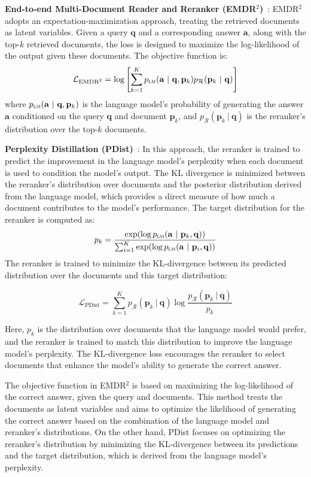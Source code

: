\textbf{End-to-end Multi-Document Reader and Reranker (EMDR$^2$)}~\cite{DBLP:conf/nips/SachanRHDY21, DBLP:conf/naacl/ShiMYS0LZY24, DBLP:conf/iclr/Lin0CSL00KSLZY24}: EMDR$^2$ adopts an expectation-maximization approach, treating the retrieved documents as latent variables. Given a query $\mathbf{q}$ and a corresponding answer $\mathbf{a}$, along with the top-$k$ retrieved documents, the loss is designed to maximize the log-likelihood of the output given these documents. The objective function is:
\[
\mathcal{L}_{\text{EMDR}^2} = \log \left[ \sum_{k=1}^K p_{\textsc{lm}}(\mathbf{a} \ | \ \mathbf{q}, \mathbf{p}_k) p_{\mathcal{R}}(\mathbf{p}_k \ | \ \mathbf{q}) \right]
\]
where $p_{\textsc{lm}}(\mathbf{a} \ | \ \mathbf{q}, \mathbf{p}_k)$ is the language model’s probability of generating the answer $\mathbf{a}$ conditioned on the query $\mathbf{q}$ and document $\mathbf{p}_k$, and $p_{\mathcal{R}}(\mathbf{p}_k \ | \ \mathbf{q})$ is the reranker’s distribution over the top-$k$ documents.

\textbf{Perplexity Distillation (PDist)}~\cite{DBLP:journals/jmlr/IzacardLLHPSDJRG23, DBLP:conf/naacl/GlassRCNCG22}: In this approach, the reranker is trained to predict the improvement in the language model’s perplexity when each document is used to condition the model’s output. The KL divergence is minimized between the reranker's distribution over documents and the posterior distribution derived from the language model, which provides a direct measure of how much a document contributes to the model’s performance. The target distribution for the reranker is computed as:
\[
p_k = \frac{\exp(\log p_{\textsc{lm}} (\mathbf{a} \ | \ \mathbf{p}_k, \mathbf{q}))}{\sum_{i=1}^K \exp ( \log p_{\textsc{lm}} (\mathbf{a} \ | \ \mathbf{p}_i, \mathbf{q}))}
\]
The reranker is trained to minimize the KL-divergence between its predicted distribution over the documents and this target distribution:

\[
\mathcal{L}_{\text{PDist}} = \sum_{k=1}^K p_{\mathcal{R}}(\mathbf{p}_k \ | \ \mathbf{q}) \log \frac{p_{\mathcal{R}}(\mathbf{p}_k \ | \ \mathbf{q})}{p_k}
\]

Here, $p_k$ is the distribution over documents that the language model would prefer, and the reranker is trained to match this distribution to improve the language model's perplexity. The KL-divergence loss encourages the reranker to select documents that enhance the model's ability to generate the correct answer.

The objective function in EMDR$^2$ is based on maximizing the log-likelihood of the correct answer, given the query and documents. This method treats the documents as latent variables and aims to optimize the likelihood of generating the correct answer based on the combination of the language model and reranker’s distributions. On the other hand, PDist focuses on optimizing the reranker’s distribution by minimizing the KL-divergence between its predictions and the target distribution, which is derived from the language model’s perplexity.

